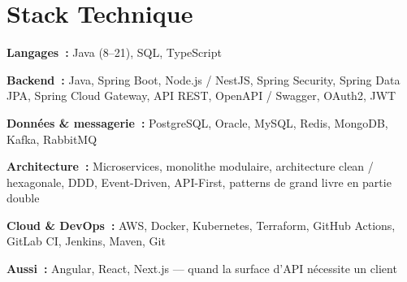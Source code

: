 \section{Stack Technique}

{\small
\textbf{Langages~:} Java (8--21), SQL, TypeScript\par
\textbf{Backend~:} Java, Spring Boot, Node.js / NestJS, Spring Security,
Spring Data JPA, Spring Cloud Gateway, API REST, OpenAPI / Swagger,
OAuth2, JWT\par
\textbf{Donn\'ees \& messagerie~:} PostgreSQL, Oracle, MySQL, Redis,
MongoDB, Kafka, RabbitMQ\par
\textbf{Architecture~:} Microservices, monolithe modulaire, architecture
clean / hexagonale, DDD, Event-Driven, API-First, patterns de grand livre
en partie double\par
\textbf{Cloud \& DevOps~:} AWS, Docker, Kubernetes, Terraform, GitHub
Actions, GitLab CI, Jenkins, Maven, Git\par
\textbf{Aussi~:} Angular, React, Next.js --- quand la surface d'API
n\'ecessite un client\par
}
